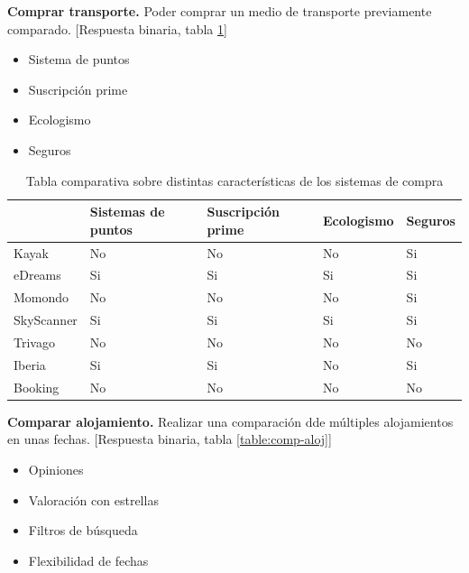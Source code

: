 \textbf{Comprar transporte.} Poder comprar un medio de transporte previamente comparado. [Respuesta binaria, tabla \ref{table:comprar-transporte}]

\begin{itemize}
    \item Sistema de puntos
    \item Suscripción prime 
    \item Ecologismo 
    \item Seguros
\end{itemize}

\begin{table}[H]
    \centering
    \begin{tabular}{l|l|l|l|l|}
    \cline{2-5}
                                     & Sistemas de puntos & Suscripción prime & Ecologismo & Seguros \\ \hline
    \multicolumn{1}{|l|}{Kayak}      & No                 & No                & No         & Si      \\ \hline
    \multicolumn{1}{|l|}{eDreams}    & Si                 & Si                & Si         & Si      \\ \hline
    \multicolumn{1}{|l|}{Momondo}    & No                 & No                & No         & Si      \\ \hline
    \multicolumn{1}{|l|}{SkyScanner} & Si                 & Si                & Si         & Si      \\ \hline
    \multicolumn{1}{|l|}{Trivago}    & No                 & No                & No         & No      \\ \hline
    \multicolumn{1}{|l|}{Iberia}     & Si                 & Si                & No         & Si      \\ \hline
    \multicolumn{1}{|l|}{Booking}    & No                 & No                & No         & No      \\ \hline
    \end{tabular}
    \caption{Tabla comparativa sobre distintas características de los sistemas de compra}
    \label{table:comprar-transporte}
    \end{table}

\textbf{Comparar alojamiento.} Realizar una comparación dde múltiples alojamientos en unas fechas. [Respuesta binaria, tabla \ref{table:comp-aloj}]

\begin{itemize}
    \item Opiniones 
    \item Valoración con estrellas 
    \item Filtros de búsqueda 
    \item Flexibilidad de fechas
\end{itemize}

